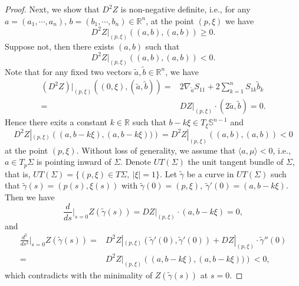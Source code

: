 \documentclass[11pt,reqno]{amsart}
\theoremstyle{definition}
\theoremstyle{remark}
\numberwithin{equation}{section}
\renewcommand{\(}{\left(}
\renewcommand{\)}{\right)}
\renewcommand{\-}{\overline}
\begin{document}
\begin{proof}
Next, we show that $D^2Z$ is non-negative definite, i.e., for any $a=(a_1,\cdots,a_n)$, $b=(b_1,\cdots,b_n)\in\mathbb{R}^n$, at the point $(p,\xi)$ we have
	\begin{equation*}
	D^2Z|_{(p,\xi)}\left((a,b),(a,b)\right)\geq 0.
	\end{equation*}
	Suppose not, then there exists $(a,b)$ such that
	\begin{equation*}
	D^2Z|_{(p,\xi)}\left((a,b),(a,b)\right)<0.
	\end{equation*}
	Note that for any fixed two vectors $\tilde{a},\tilde{b}\in\mathbb{R}^{n}$, we have
	\begin{align*}
	(D^2Z)|_{(p,\xi)}((0,\xi),(\tilde{a},\tilde{b}))=&2\nabla_{\tilde{a}}S_{11}+2\sum_{k=1}^{n}S_{1k}\tilde{b}_k\\
=&DZ|_{(p,\xi)}\cdot \left(2\tilde{a},\tilde{b}\right)=0.
	\end{align*}
	Hence there exits a constant $k\in\mathbb{R}$ such that $b-k\xi\in T_{\xi}\mathbb{S}^{n-1}$ and
	\begin{equation*}
	D^2Z|_{(p,\xi)}\left((a,b-k\xi),(a,b-k\xi))\right)=D^2Z|_{(p,\xi)}\left((a,b),(a,b)\right)<0
	\end{equation*}
	at the point $(p,\xi)$. Without loss of generality, we assume that $\langle a,\mu\rangle<0$, i.e., $a\in T_p\Sigma$ is pointing inward of $\Sigma$. Denote $UT(\Sigma)$ the unit tangent bundle of $\Sigma$, that is, $UT(\Sigma)=\{(p,\xi)\in T\Sigma, ~|\xi|=1\}$. Let $\tilde{\gamma}$ be a curve in $UT(\Sigma)$  such that $\tilde{\gamma}(s)=(p(s),\xi(s))$ with $\tilde{\gamma}(0)=(p,\xi),\ \tilde{\gamma}'(0)=(a,b-k\xi)$. Then we have
	\begin{equation*}
	\frac{d}{ds}\Big|_{s=0}Z(\tilde{\gamma}(s))=DZ|_{(p,\xi)}\cdot(a,b-k\xi)=0,
	\end{equation*}
	and
	\begin{align*} \frac{d^2}{ds^2}\Big|_{s=0}Z(\tilde{\gamma}(s))=&D^2Z|_{(p,\xi)}(\tilde{\gamma}'(0),\tilde{\gamma}'(0))+DZ|_{(p,\xi)}\cdot\tilde{\gamma}''(0)\\
	=&D^2Z|_{(p,\xi)}\left((a,b-k\xi),(a,b-k\xi))\right)<0,
	\end{align*}
	which contradicts with the minimality of $Z(\tilde{\gamma}(s))$ at $s=0$.
\end{proof}
\end{document}
